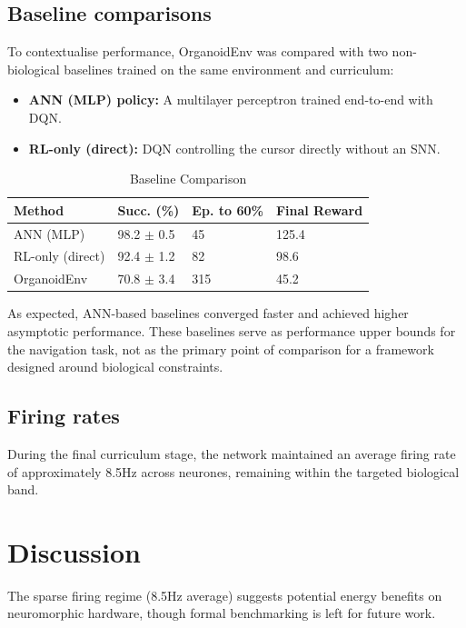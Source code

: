 \documentclass[journal]{IEEEtran}
\begin{document}
\subsection{Baseline comparisons}

To contextualise performance, OrganoidEnv was compared with two non-biological baselines trained on the same environment and curriculum:

\begin{itemize}
    \item \textbf{ANN (MLP) policy:} A multilayer perceptron trained end-to-end with DQN.
    \item \textbf{RL-only (direct):} DQN controlling the cursor directly without an SNN.
\end{itemize}

\begin{table}[t]
\caption{Baseline Comparison}
\label{tab:baselines}
\centering
\begin{tabular}{l l l l}
\hline
\textbf{Method} & \textbf{Succ. (\%)} & \textbf{Ep. to 60\%} & \textbf{Final Reward} \\
\hline
ANN (MLP) & 98.2 $\pm$ 0.5 & 45 & 125.4 \\
RL-only (direct) & 92.4 $\pm$ 1.2 & 82 & 98.6 \\
OrganoidEnv & 70.8 $\pm$ 3.4 & 315 & 45.2 \\
\hline
\end{tabular}
\end{table}

As expected, ANN-based baselines converged faster and achieved higher asymptotic performance. 
These baselines serve as performance upper bounds for the navigation task, not as the primary point of comparison for a framework designed around biological constraints.

\subsection{Firing rates}

During the final curriculum stage, the network maintained an average firing rate of approximately 8.5Hz across neurones, remaining within the targeted biological band.

\section{Discussion}

The sparse firing regime (8.5Hz average) suggests potential energy benefits on neuromorphic hardware, though formal benchmarking is left for future work.
\end{document}
